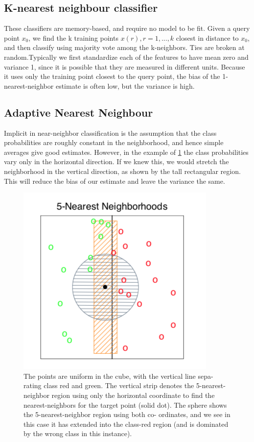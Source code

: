 \documentclass[12pt, letterpaper]{article}
\theoremstyle{definition}
\begin{document}
\subsection{K-nearest neighbour classifier}
These classifiers are memory-based, and require no model to be fit. Given a query point $x_0$, we find the k training points $x(r),r = 1,...,k$ closest in distance to $x_0$, and then classify using majority vote among the k-neighbors. Ties are broken at random.Typically we first standardize each of the features to have mean zero and variance 1, since it is possible that they are measured in different units. Because it uses only the training point closest to the query point, the bias of the 1-nearest-neighbor estimate is often low, but the variance is high.

\subsection{Adaptive Nearest Neighbour}
Implicit in near-neighbor classification is the assumption that the class probabilities are roughly constant in the neighborhood, and hence simple averages give good estimates.
However, in the example of \ref{DANN} the class probabilities vary only in the horizontal direction. If we knew this, we would stretch the neighborhood in the vertical direction, as shown by the tall rectangular region. This will reduce the bias of our estimate and leave the variance the same.

\begin{figure}
\centering
\includegraphics[scale=0.7]{img/DANN}
\caption{The points are uniform in the cube, with the vertical line sepa- rating class red and green. The vertical strip denotes the 5-nearest-neighbor region using only the horizontal coordinate to find the nearest-neighbors for the target point (solid dot). The sphere shows the 5-nearest-neighbor region using both co- ordinates, and we see in this case it has extended into the class-red region (and is dominated by the wrong class in this instance).}
\label{DANN}
\end{figure}
\end{document}
